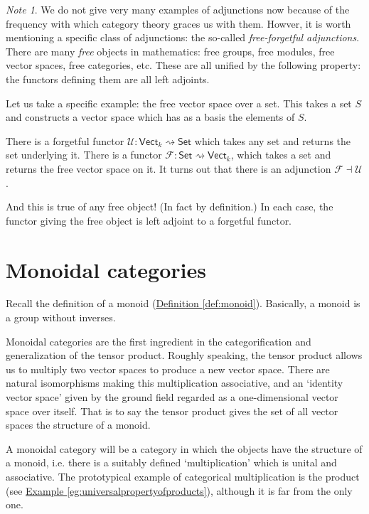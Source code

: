 \documentclass[a4paper]{report}
\theoremstyle{definition}
\theoremstyle{plain}
\theoremstyle{remark}
\newtheorem{note}{Note}[section]
\begin{document}
\begin{note}
  We do not give very many examples of adjunctions now because of the frequency with which category theory graces us with them. Howver, it is worth mentioning a specific class of adjunctions: the so-called \emph{free-forgetful adjunctions}. There are many \emph{free} objects in mathematics: free groups, free modules, free vector spaces, free categories, etc. These are all unified by the following property: the functors defining them are all left adjoints.

  Let us take a specific example: the free vector space over a set. This takes a set $S$ and constructs a vector space which has as a basis the elements of $S$.

  There is a forgetful functor $\mathcal{U}\colon \mathsf{Vect}_{k} \rightsquigarrow \mathsf{Set}$ which takes any set and returns the set underlying it. There is a functor $\mathcal{F}\colon \mathsf{Set} \rightsquigarrow \mathsf{Vect}_{k}$, which takes a set and returns the free vector space on it. It turns out that there is an adjunction $\mathcal{F} \dashv \mathcal{U}$.

  And this is true of any free object! (In fact by definition.) In each case, the functor giving the free object is left adjoint to a forgetful functor.
\end{note}

\section{Monoidal categories} \label{sec:monoidalcategories}
Recall the definition of a monoid (\hyperref[def:monoid]{Definition \ref*{def:monoid}}). Basically, a monoid is a group without inverses. 

Monoidal categories are the first ingredient in the categorification and generalization of the tensor product. Roughly speaking, the tensor product allows us to multiply two vector spaces to produce a new vector space. There are natural isomorphisms making this multiplication associative, and an `identity vector space' given by the ground field regarded as a one-dimensional vector space over itself. That is to say the tensor product gives the set of all vector spaces the structure of a monoid.

A monoidal category will be a category in which the objects have the structure of a monoid, i.e. there is a suitably defined `multiplication' which is unital and associative. The prototypical example of categorical multiplication is the product (see \hyperref[eg:universalpropertyofproducts]{Example \ref*{eg:universalpropertyofproducts}}), although it is far from the only one.
\end{document}

